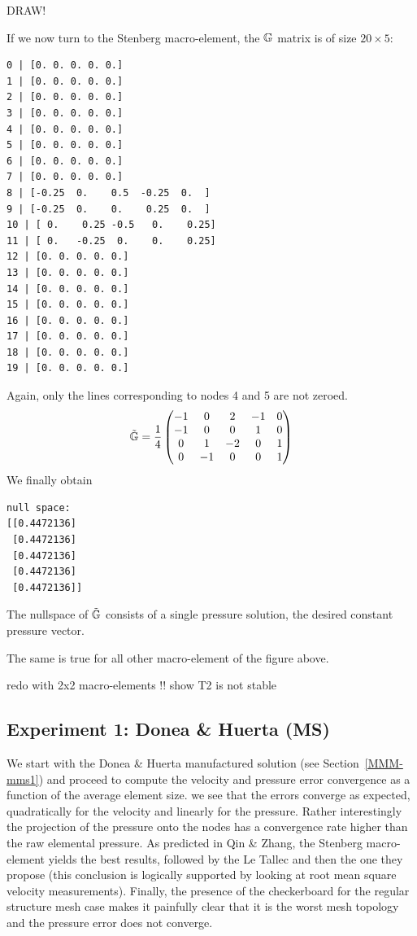 {\color{red} DRAW!}


If we now turn to the Stenberg macro-element, the ${\mathbb{G}}$ matrix 
is of size  $20\times 5$: 
{\small
\begin{verbatim}
0 | [0. 0. 0. 0. 0.]
1 | [0. 0. 0. 0. 0.]
2 | [0. 0. 0. 0. 0.]
3 | [0. 0. 0. 0. 0.]
4 | [0. 0. 0. 0. 0.]
5 | [0. 0. 0. 0. 0.]
6 | [0. 0. 0. 0. 0.]
7 | [0. 0. 0. 0. 0.]
8 | [-0.25  0.    0.5  -0.25  0.  ]
9 | [-0.25  0.    0.    0.25  0.  ]
10 | [ 0.    0.25 -0.5   0.    0.25]
11 | [ 0.   -0.25  0.    0.    0.25]
12 | [0. 0. 0. 0. 0.]
13 | [0. 0. 0. 0. 0.]
14 | [0. 0. 0. 0. 0.]
15 | [0. 0. 0. 0. 0.]
16 | [0. 0. 0. 0. 0.]
17 | [0. 0. 0. 0. 0.]
18 | [0. 0. 0. 0. 0.]
19 | [0. 0. 0. 0. 0.]
\end{verbatim}
}
Again, only the lines corresponding to nodes 4 and 5 are not zeroed.
\[
\tilde{{\mathbb{G}}}=
\frac14
\begin{pmatrix}
-1 & 0 & 2 &-1 &0 \\
-1 & 0 & 0 & 1 &0 \\
 0 & 1 &-2 & 0 &1 \\
 0 &-1 & 0 & 0 &1
\end{pmatrix}
\]
We finally obtain
\begin{verbatim}
null space:
[[0.4472136]
 [0.4472136]
 [0.4472136]
 [0.4472136]
 [0.4472136]]
\end{verbatim}
The nullspace of $\tilde{{\mathbb{G}}}$ consists of a single pressure solution, 
the desired constant pressure vector. 

The same is true for all other macro-element of the figure above. 

{\color{red} redo with 2x2 macro-elements !! show T2 is not stable}





\newpage
\subsection*{Experiment 1: Donea \& Huerta (MS)}

We start with the Donea \& Huerta manufactured solution (see Section~\ref{MMM-mms1}) and 
proceed to compute the velocity and pressure error convergence as a function of the 
average element size.
we see that the errors converge as expected, quadratically for the velocity and linearly for the pressure.
Rather interestingly the projection of the pressure onto the nodes has a convergence rate 
higher than the raw elemental pressure. As predicted in Qin \& Zhang, the Stenberg macro-element 
yields the best results, followed by the Le Tallec and then the one they propose (this conclusion 
is logically supported by looking at root mean square velocity measurements). 
Finally, the presence of the checkerboard for the regular structure mesh case
makes it painfully clear that it is the worst mesh topology 
and the pressure error does not converge.  

